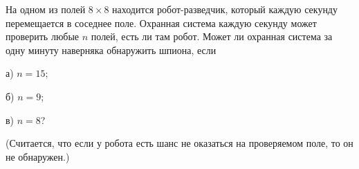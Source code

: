 
На одном из полей $8\times8$ находится робот-разведчик, который каждую секунду перемещается в соседнее поле. Охранная 
система каждую секунду может проверить любые $n$ полей, есть ли там робот. Может ли охранная система за одну минуту наверняка обнаружить шпиона, если

а) $n=15$;

б) $n=9$;

в) $n=8$?

(Считается, что если у робота есть шанс не оказаться на проверяемом поле, то он не обнаружен.)